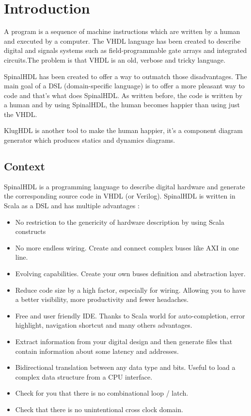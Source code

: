 \chapter{Introduction}
\label{cha:Introduction}

A program is a sequence of machine instructions which are written by a
human and executed by a computer. The VHDL language has been created to describe
digital and signals systems such as field-programmable gate arrays and
integrated circuits\cite{wiki-vhdl}.The problem is that VHDL is an old, verbose
and tricky language.

SpinalHDL has been created to offer a way to outmatch those disadvantages. The
main goal of a DSL (domain-specific language) is to offer a more pleasant way to
code and that's what does SpinalHDL. As written before, the code is written by a
human and by using SpinalHDL, the human becomes happier than using just the VHDL.

KlugHDL is another tool to make the human happier, it's a component diagram
generator which produces statics and dynamics diagrams.

\section{Context}
\label{sec:Context}

SpinalHDL is a programming language to describe digital hardware and generate
the corresponding source code in VHDL (or Verilog). SpinalHDL is written in Scala as a DSL
and has multiple advantages\cite{github-spinalhdl} :
\begin{itemize}
    \item No restriction to the genericity of hardware description by using
      Scala constructs
    \item No more endless wiring. Create and connect complex buses like AXI in one line.
    \item Evolving capabilities. Create your own buses definition and abstraction layer.
    \item Reduce code size by a high factor, especially for wiring. Allowing you
      to have a better visibility, more productivity and fewer headaches.
    \item Free and user friendly IDE. Thanks to Scala world for auto-completion,
      error highlight, navigation shortcut and many others advantages.
    \item Extract information from your digital design and then generate files
      that contain information about some latency and addresses.
    \item Bidirectional translation between any data type and bits. Useful to
      load a complex data structure from a CPU interface.
    \item Check for you that there is no combinational loop / latch.
    \item Check that there is no unintentional cross clock domain.
\end{itemize}

